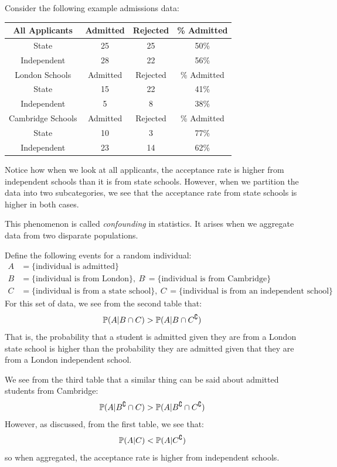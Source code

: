 \documentclass[../main.tex]{subfiles}
\begin{document}
\begin{example}
  Consider the following example admissions data:
  \begin{center}
    \begin{tabular}{c|c|c|c}
      \hline\hline
      All Applicants & Admitted & Rejected & \% Admitted \\
      \hline
      State & 25 & 25 & 50\% \\
      Independent & 28 & 22 & 56\% \\
      \hline\hline
      London Schools & Admitted & Rejected & \% Admitted \\
      \hline
      State & 15 & 22 & 41\% \\
      Independent & 5 & 8 & 38\% \\
      \hline\hline
      Cambridge Schools & Admitted & Rejected & \% Admitted \\
      \hline
      State & 10 & 3 & 77\% \\
      Independent & 23 & 14 & 62\% \\
    \end{tabular}
  \end{center}
  Notice how when we look at all applicants, the acceptance rate is higher from independent schools than it is from state schools.
  However, when we partition the data into two subcategories, we see that the acceptance rate from state schools is higher in both cases.

  This phenomenon is called \textit{confounding} in statistics.
  It arises when we aggregate data from two disparate populations.

  Define the following events for a random individual:
  \begin{align*}
    A &= \{\text{individual is admitted}\} \\
    B &= \{\text{individual is from London}\},\ B^{\comp} = \{\text{individual is from Cambridge}\} \\
    C &= \{\text{individual is from a state school}\},\ C^{\comp} = \{\text{individual is from an independent school}\}
  \end{align*}
  For this set of data, we see from the second table that:
  \[
    \mathbb{P}(A \vert B \cap C) > \mathbb{P}(A \vert B \cap C^\complement)
  \]
  That is, the probability that a student is admitted given they are from a London state school is higher than the probability they are admitted given that they are from a London independent school.

  We see from the third table that a similar thing can be said about admitted students from Cambridge:
  \[
    \mathbb{P}(A \vert B^{\complement} \cap C) > \mathbb{P}(A \vert B^{\complement} \cap C^\complement)
  \]
  However, as discussed, from the first table, we see that:
  \[
    \mathbb{P}(A \vert C) < \mathbb{P}(A \vert C^\complement)
  \]
  so when aggregated, the acceptance rate is higher from independent schools.


\end{example}
\end{document}
